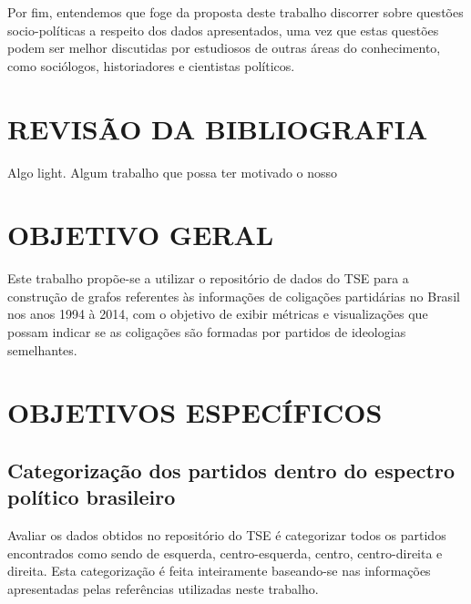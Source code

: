 Por fim, entendemos que foge da proposta deste trabalho discorrer sobre questões socio-políticas a respeito dos dados apresentados, uma vez que estas questões podem ser melhor discutidas por estudiosos de outras áreas do conhecimento, como sociólogos, historiadores e cientistas políticos.

\section{\texorpdfstring{\MakeUppercase{Revisão da Bibliografia}}{}}
\label{proposta__revisao_bibliografia}

Algo light. Algum trabalho que possa ter motivado o nosso



\section{\texorpdfstring{\MakeUppercase{Objetivo Geral}}{}}
\label{proposta__objetivo-geral}

Este trabalho propõe-se a utilizar o repositório de dados do \gls{TSE} para a construção de grafos referentes às informações de coligações partidárias no Brasil nos anos 1994 à 2014, com o objetivo de exibir métricas e visualizações que possam indicar se as coligações são formadas por partidos de ideologias semelhantes.

\section{\texorpdfstring{\MakeUppercase{Objetivos Específicos}}{}}
\label{proposta__objetivos-especificos}

\subsection{Categorização dos partidos dentro do espectro político brasileiro}
\label{proposta__objetivos-especificos--categorizacao}

Avaliar os dados obtidos no repositório do \gls{TSE} é categorizar todos os partidos encontrados como sendo de esquerda, centro-esquerda, centro, centro-direita e direita. Esta categorização é feita inteiramente baseando-se nas informações apresentadas pelas referências utilizadas neste trabalho.


